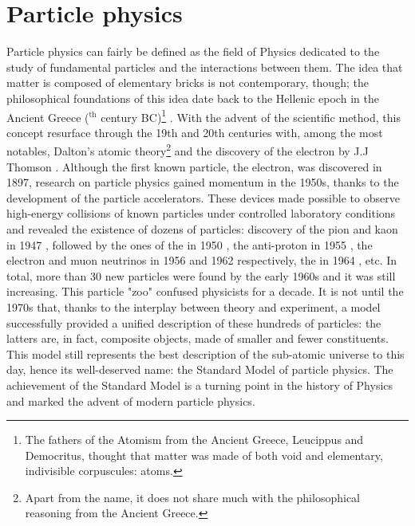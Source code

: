 
\chapter{Particle physics}
\label{sec:Section01-Intro}

Particle physics can fairly be defined as the field of Physics dedicated to the study of fundamental particles and the interactions between them. The idea that matter is composed of elementary bricks is not contemporary, though; the philosophical foundations of this idea date back to the Hellenic epoch in the Ancient Greece ($^{\text{th}}$ century BC)\footnote{The fathers of the Atomism from the Ancient Greece, Leucippus and Democritus, thought that matter was made of both void and elementary, indivisible corpuscules: atoms.} \cite{pullmanAtomHistoryHuman1998}. With the advent of the scientific method, this concept resurface through the 19th and 20th centuries with, among the most notables, Dalton's atomic theory\footnote{Apart from the name, it does not share much with the philosophical reasoning from the Ancient Greece.} and the discovery of the electron by J.J Thomson \cite{thomsonXLCathodeRays1897}. Although the first known particle, the electron, was discovered in 1897, research on particle physics gained momentum in the 1950s, thanks to the development of the particle accelerators. These devices made possible to observe high-energy collisions of known particles under controlled laboratory conditions and revealed the existence of dozens of particles: discovery of the pion \cite{lattesProcessesInvolvingCharged1947} and kaon in 1947 \cite{rochesterdr.EvidenceExistenceNew1947}, followed by the ones of the \rmLambda in 1950 \cite{hopperEvidenceConcerningExistence1950}, the anti-proton in 1955 \cite{chamberlainObservationAntiprotons1955}, the electron and muon neutrinos in 1956 \cite{reinesNeutrino1956} and 1962 \cite{danbyObservationHighEnergyNeutrino1962} respectively, the \rmXi in 1964 \cite{barnesObservationHyperonStrangeness1964}, etc. In total, more than 30 new particles were found by the early 1960s \cite{serwayModernPhysics2004} and it was still increasing. This particle "zoo" confused physicists for a decade. It is not until the 1970s that, thanks to the interplay between theory and experiment, a model successfully provided a unified description of these hundreds of particles: the latters are, in fact, composite objects, made of smaller and fewer constituents. This model still represents the best description of the sub-atomic universe to this day, hence its well-deserved name: the Standard Model of particle physics. The achievement of the Standard Model is a turning point in the history of Physics and marked the advent of modern particle physics.


